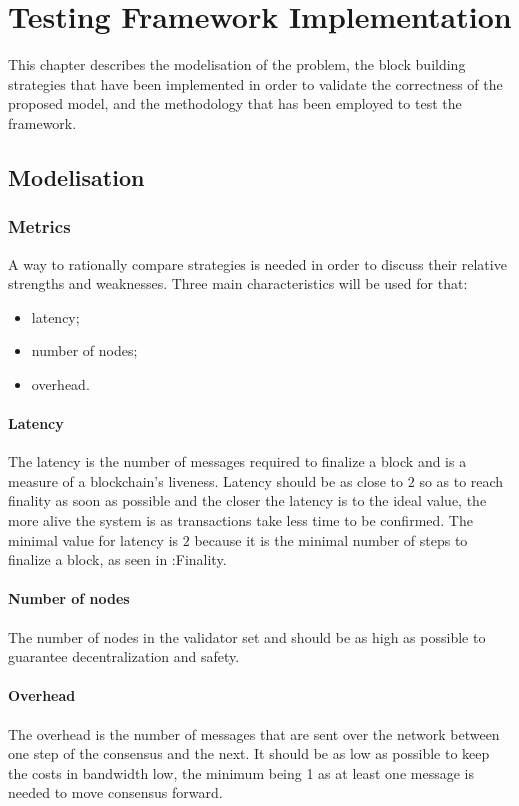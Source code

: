 \chapter{Testing Framework Implementation}
\label{chap:implementation}

This chapter describes the modelisation of the problem, the block building
strategies that have been implemented in order to validate the correctness of
the proposed model, and the methodology that has been employed to test the
framework.

\section{Modelisation}
\subsection{Metrics}
\FloatBarrier
A way to rationally compare strategies is needed in order to discuss their
relative strengths and weaknesses. Three main characteristics will be used for
that:
\begin{itemize}
        \item latency;
        \item number of nodes;
        \item overhead.
\end{itemize}

\subsubsection{Latency}
The latency is the number of messages required to finalize a block and is a
measure of a blockchain's liveness. Latency should be as close to \(2\) 
 so as to reach finality as soon as possible and the closer the latency is to the ideal
value, the more alive the system is as transactions take less time to be
confirmed. The minimal value for latency is \(2\) because it is the minimal
number of steps to finalize a block, as seen in :Finality.

\subsubsection{Number of nodes}
The number of nodes in the validator set and should be as high as possible to
guarantee decentralization and safety.

\subsubsection{Overhead}
The overhead is the number of messages that are sent over the network between
one step of the consensus and the next. It should be as low as possible to keep
the costs in bandwidth low, the minimum being 1 as at least one message is
needed to move consensus forward.

